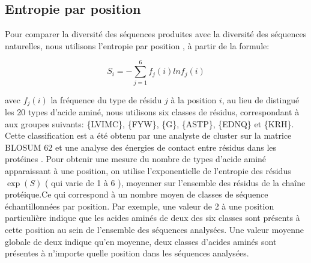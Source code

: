 \begin{enumerate}
\begin{enumerate}
\end{enumerate}

\subsection{Entropie par position}
\label{subsection:Entropie}
Pour comparer la diversité des séquences produites avec la diversité des séquences naturelles, nous utilisons l'entropie par position \cite{DurbinBK}, à partir de la formule:

\begin{equation} \label{eq:entropy}
  S_i = - \sum_{j=1}^6 f_j(i)lnf_j(i)
\end{equation} 


avec $f_j(i)$ la fréquence du type de résidu $j$ à la position $i$, au lieu de distingué les 20 types d'acide aminé, nous utilisons six classes de résidus, correspondant à  aux groupes suivants: \{LVIMC\}, \{FYW\}, \{G\}, \{ASTP\}, \{EDNQ\} et \{KRH\}. Cette classification est a été obtenu par une analyste de cluster  sur la matrice BLOSUM 62 \label{eq:entropy} et une analyse  des énergies de contact entre résidus dans les protéines \cite{Launay07} . Pour obtenir une mesure du nombre de types d'acide aminé apparaissant à une position, on utilise l'exponentielle de l'entropie des résidus $\exp(S)$ ( qui varie de 1 à 6 ), moyenner sur l'ensemble des résidus de la chaîne protéique.Ce qui correspond à un nombre moyen de classes de séquence échantillonnées par position. Par exemple, une valeur de 2 à une position particulière indique que les acides aminés de deux des six classes sont présents à cette position au sein de l'ensemble des séquences analysées. Une valeur moyenne globale de deux indique qu'en moyenne, deux classes d'acides aminés sont présentes à n'importe quelle position dans les séquences analysées.



\clearpage


